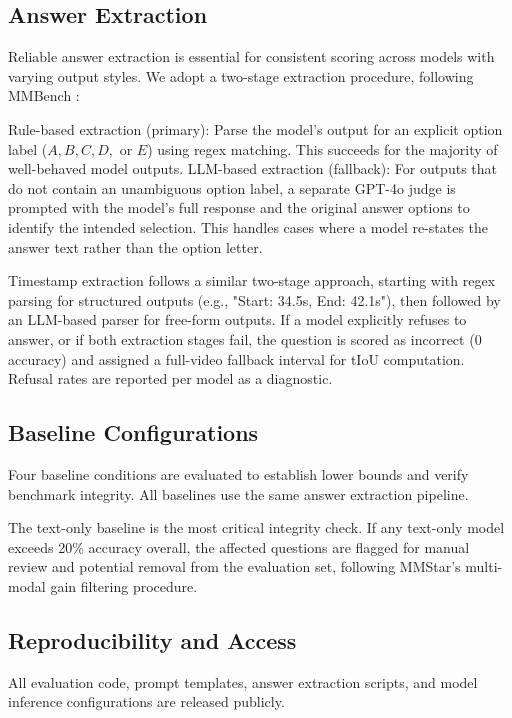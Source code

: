 \documentclass[sigconf,natbib=false,nonacm]{acmart}
\begin{document}
\subsection{Answer Extraction}
Reliable answer extraction is essential for consistent scoring across models with varying output styles. We adopt a two-stage extraction procedure, following MMBench \cite{mmbench}:

Rule-based extraction (primary): Parse the model's output for an explicit option label ($A, B, C, D,$ or $E$) using regex matching. This succeeds for the majority of well-behaved model outputs.
LLM-based extraction (fallback): For outputs that do not contain an unambiguous option label, a separate GPT-4o \cite{gpt-4o} judge is prompted with the model's full response and the original answer options to identify the intended selection. This handles cases where a model re-states the answer text rather than the option letter.

Timestamp extraction follows a similar two-stage approach, starting with regex parsing for structured outputs (e.g., "Start: 34.5s, End: 42.1s"), then followed by an LLM-based parser for free-form outputs.
If a model explicitly refuses to answer, or if both extraction stages fail, the question is scored as incorrect (0 accuracy) and assigned a full-video fallback interval for tIoU computation. Refusal rates are reported per model as a diagnostic.

\subsection{Baseline Configurations}
Four baseline conditions are evaluated to establish lower bounds and verify benchmark integrity. All baselines use the same answer extraction pipeline.

The text-only baseline is the most critical integrity check. If any text-only model exceeds 20\% accuracy overall, the affected questions are flagged for manual review and potential removal from the evaluation set, following MMStar's \cite{mmstar} multi-modal gain filtering procedure.

\subsection{Reproducibility and Access}
All evaluation code, prompt templates, answer extraction scripts, and model inference configurations are released publicly.

\end{document}
